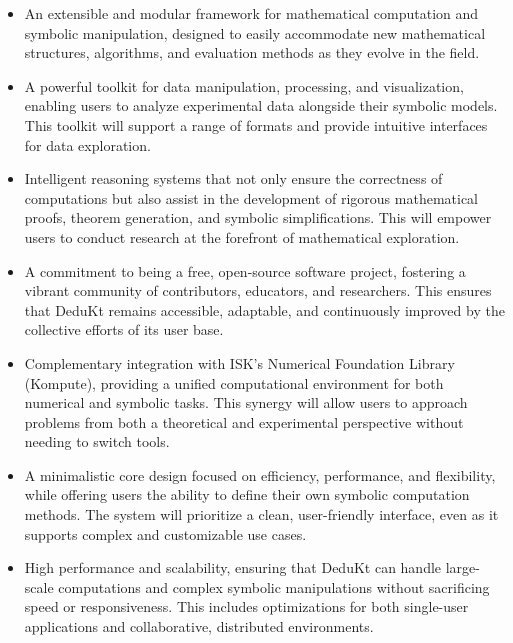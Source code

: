 \begin{itemize}
    \item An extensible and modular framework for mathematical computation and symbolic manipulation, designed to easily accommodate new mathematical structures, algorithms, and evaluation methods as they evolve in the field.
    \item A powerful toolkit for data manipulation, processing, and visualization, enabling users to analyze experimental data alongside their symbolic models.
    This toolkit will support a range of formats and provide intuitive interfaces for data exploration.
    \item Intelligent reasoning systems that not only ensure the correctness of computations but also assist in the development of rigorous mathematical proofs, theorem generation, and symbolic simplifications.
    This will empower users to conduct research at the forefront of mathematical exploration.
    \item A commitment to being a free, open-source software project, fostering a vibrant community of contributors, educators, and researchers.
    This ensures that DeduKt remains accessible, adaptable, and continuously improved by the collective efforts of its user base.
    \item Complementary integration with ISK's Numerical Foundation Library (Kompute), providing a unified computational environment for both numerical and symbolic tasks.
    This synergy will allow users to approach problems from both a theoretical and experimental perspective without needing to switch tools.
    \item A minimalistic core design focused on efficiency, performance, and flexibility, while offering users the ability to define their own symbolic computation methods.
    The system will prioritize a clean, user-friendly interface, even as it supports complex and customizable use cases.
    \item High performance and scalability, ensuring that DeduKt can handle large-scale computations and complex symbolic manipulations without sacrificing speed or responsiveness.
    This includes optimizations for both single-user applications and collaborative, distributed environments.
\end{itemize}

